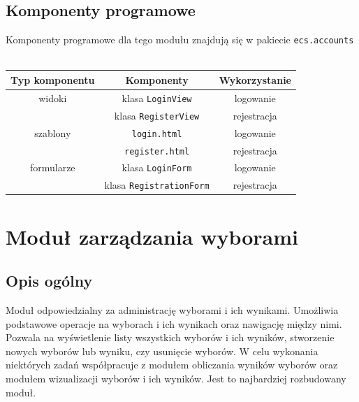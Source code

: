 \documentclass[pdflatex,11pt]{../aghdoc_version2}
\newcommand{\code}[1]{\texttt{#1}}
\begin{document}
\subsection{Komponenty programowe}
Komponenty programowe dla tego modułu znajdują się w pakiecie \code{ecs.accounts} \\ \\
{
\centering
\begin{tabular}{|c|c|c|}
\hline
\textbf{Typ komponentu} & \textbf{Komponenty} & \textbf{Wykorzystanie} \\
\hline
widoki & klasa \code{LoginView} & logowanie \\
\cline{2-3}
 & klasa \code{RegisterView} & rejestracja \\
\hline
szablony & \code{login.html} & logowanie \\
\cline{2-3}
 & \code{register.html} & rejestracja \\
\hline
formularze & klasa \code{LoginForm} & logowanie \\
\cline{2-3}
 & klasa \code{RegistrationForm} & rejestracja \\
\hline
\end{tabular}
}

\section{Moduł zarządzania wyborami}
\subsection{Opis ogólny}
Moduł odpowiedzialny za administrację wyborami i ich wynikami. Umożliwia podstawowe
operacje na wyborach i ich wynikach oraz nawigację między nimi. Pozwala na wyświetlenie
listy wszystkich wyborów i ich wyników, stworzenie nowych wyborów lub wyniku, czy
usunięcie wyborów. W celu wykonania niektórych zadań współpracuje z modułem obliczania
wyników wyborów oraz modułem wizualizacji wyborów i ich wyników. Jest to najbardziej
rozbudowany moduł.
\clearpage
\end{document}
